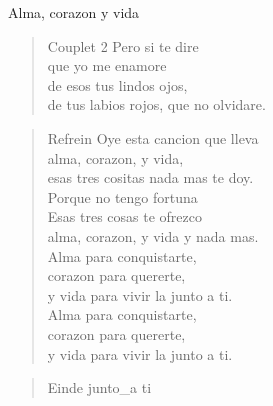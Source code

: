 \begin{song}[vals]{Alma, corazon y vida}
\begin{verse}{Couplet 2}
\hspace{0.6cm}Pero si te dire\\
\hspace{0.6cm}que yo me enamore\\
\hspace{0.6cm}de esos tus lindos ojos,\\
\hspace{0.6cm}de tus labios rojos, que no olvidare.\hspace{0.5cm}
\end{verse}
\begin{verse}{Refrein}
Oye esta cancion que lleva\\
alma, corazon, y vida,\\
esas tres cositas nada mas te doy.\\
Porque no tengo fortuna\\
Esas tres cosas te ofrezco\\
alma, corazon, y vida y nada mas.\\
Alma para conquistarte,\\ 
corazon para quererte,\\ 
y vida para vivir la junto a ti.\hspace{0.6cm}    \\
Alma para conquistarte,\\
corazon para quererte,\\
y vida para vivir la junto a ti.\\
\end{verse}

\begin{verse}{Einde}
junto\_a ti\hspace{1.5em}  \hspace{1.5em} \\
\end{verse}
\end{song}

